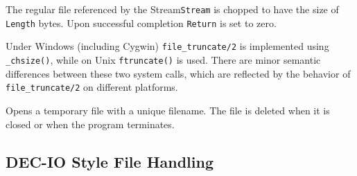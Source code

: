 \begin{description}

    The regular file  referenced by the Stream{\tt Stream}
    is chopped to have the size of {\tt Length} bytes. Upon successful
    completion {\tt Return} is set to zero.

\portability Under Windows (including Cygwin) {\tt file\_truncate/2}
is implemented using {\tt \_chsize()}, while on Unix {\tt ftruncate()}
is used.  There are minor semantic differences between these two
system calls, which are reflected by the behavior of {\tt
file\_truncate/2} on different platforms.

    Opens a temporary file with a unique filename. The file is deleted
    when it is closed or when the program terminates.

\end{description}

\subsection{DEC-IO Style File Handling}

